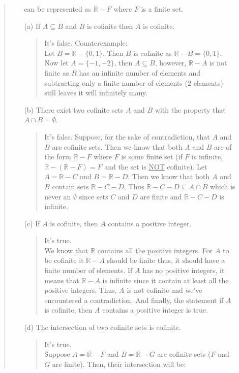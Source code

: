 \documentclass[12pt, a4paper]{article}                      %
\begin{document}
\begin{enumerate}
\begin{quote}
\begin{itemize}
can be represented as $\mathbb{R} - F$ where $F$ is a finite set.
\item[(a)]
If $A \subseteq B$ and $B$ is cofinite then $A$ is cofinite.
\begin{quote}
It's false. Counterexample:\\
Let $B = \mathbb{R} - \{0, 1\}$. Then $B$ is cofinite as $\mathbb{R} - B = \{0, 1\}$.
Now let $A = \{-1, -2\}$, then $A \subseteq B$, however, $\mathbb{R} - A$ is not finite
as $R$ has an infinite number of elements and subtracting only a finite number of elements
(2 elements) still leaves it will infinitely many.
\end{quote}
\item[(b)]
There exist two cofinite sets $A$ and $B$ with the property that\\
$A \cap B = \emptyset$.
\begin{quote}
It's false. Suppose, for the sake of contradiction, that $A$ and $B$ are cofinite
sets. Then we know that both $A$ and $B$ are of the form $\mathbb{R} - F$ where $F$
is some finite set (if $F$ is infinite, $\mathbb{R} - (\mathbb{R} - F) = F$ and the set
is \underline{NOT} cofinite). Let $A = \mathbb{R} - C$ and $B = \mathbb{R} - D$. Then we know that
both $A$ and $B$ contain sets $\mathbb{R} - C - D$. Thus $\mathbb{R} - C - D \subseteq A \cap B$
which is never an $\emptyset$ since sets $C$ and $D$ are finite and $\mathbb{R} - C - D$ is infinite.\\
\end{quote}
\item[(c)]
If $A$ is cofinite, then $A$ contains a positive integer.
\begin{quote}
It's true.\\
We know that $\mathbb{R}$ contains all the positive integers. For $A$
to be cofinite it $\mathbb{R} - A$ should be finite thus, it should
have a finite number of elements. If $A$ has no positive integers,
it means that $\mathbb{R} - A$ is infinite since it contain
at least all the positive integers. Thus, $A$ is not cofinite and
we've encountered a contradiction. And finally, the statement if
$A$ is cofinite, then $A$ contains a positive integer is true.
\end{quote}
\item[(d)]
The intersection of two cofinite sets is cofinite.
\begin{quote}
It's true.\\
Suppose $A = \mathbb{R} - F$ and $B = \mathbb{R} - G$ are cofinite sets ($F$ and $G$ are finite).
Then, their intersection will be:

\end{quote}
\end{itemize}
\end{quote}
\end{enumerate}
\end{document}
